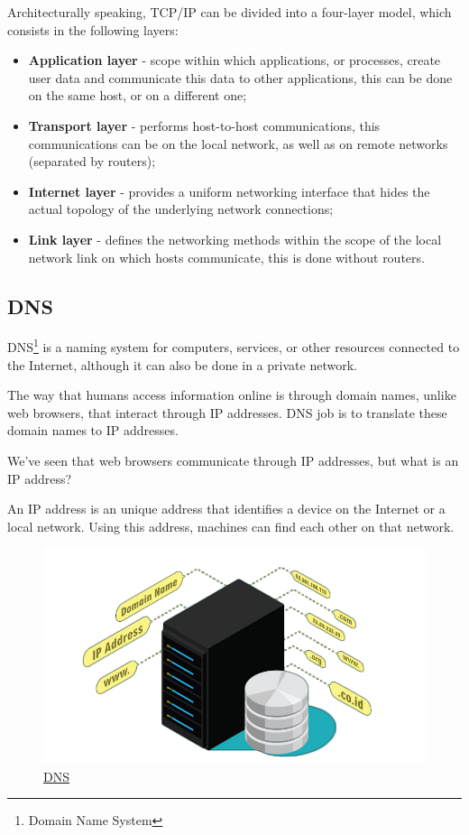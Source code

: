 \documentclass{article}
\newcommand\tab[1][1cm]{\hspace*{#1}}
\begin{document}
Architecturally speaking, TCP/IP can be divided into a four-layer model, which consists in the following layers:

\begin{itemize}
    \item \textbf{Application layer} - scope within which applications, or processes, create user data and communicate this data to other applications, this can be done on the same host, or on a different one;
    \item \textbf{Transport layer} - performs host-to-host communications, this communications can be on the local network, as well as on remote networks (separated by routers);
    \item \textbf{Internet layer} - provides a uniform networking interface that hides the actual topology of the underlying network connections;
    \item \textbf{Link layer} - defines the networking methods within the scope of the local network link on which hosts communicate, this is done without routers.
\end{itemize}

\newpage

\subsection{DNS} 

\tab DNS\footnote{Domain Name System} is a naming system for computers, services, or other resources connected to the Internet, although it can also be done in a private network.

The way that humans access information online is through domain names, unlike web browsers, that interact through IP addresses. DNS job is to translate these domain names to IP addresses.

We've seen that web browsers communicate through IP addresses, but what is an IP address?

An IP address is an unique address that identifies a device on the Internet or a local network. Using this address, machines can find each other on that network.

\begin{figure}[H]
    \begin{center}
        \includegraphics[width=0.6 \textwidth]{images/dns.png}
        \caption{\href{https://www.google.com/url?sa=i&url=https\%3A\%2F\%2Fwww.pcmag.com\%2Fhow-to\%2Fhow-and-why-to-change-your-dns-server&psig=AOvVaw0kvZbAUtDVX3KBUpHmIdu4&ust=1617099982879000&source=images&cd=vfe&ved=0CAIQjRxqFwoTCPCEmYOl1e8CFQAAAAAdAAAAABAD}{\underline{DNS}}}
    \end{center}
\end{figure}
\end{document}
